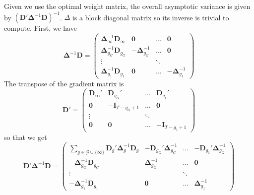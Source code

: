 \documentclass[12pt]{article}
\begin{document}
Given we use the optimal weight matrix, the overall asymptotic variance is given by $(\bm D' \bm \Delta^{-1} \bm D)^{-1}$. $\Delta$ is a block diagonal matrix so its inverse is trivial to compute. First, we have
\begin{equation*}
    \bm \Delta^{-1} \bm D = 
    \begin{pmatrix}
        \bm \Delta_{\infty}^{-1} \bm D_{\infty} & \bm 0 &  \hdots & \bm 0\\
        \bm \Delta_{g_G}^{-1} \bm D_{g_G} & -\bm \Delta_{g_G}^{-1} & \hdots & \bm 0\\
        \vdots & & \ddots &\\
        \bm \Delta_{g_1}^{-1} \bm D_{g_1} & \bm 0 & \hdots & - \bm \Delta_{g_1}^{-1}
    \end{pmatrix}
\end{equation*}
The transpose of the gradient matrix is
\begin{equation*}
    \bm D' =
    \begin{pmatrix}
        \bm D_{\infty}' & \bm D_{g_G}' & \hdots & \bm D_{g_1}'\\
        \bm 0 & -\bm I_{T-g_G + 1} & \hdots & \bm 0\\
        \vdots & & \ddots & \\
        \bm 0 & \bm 0 & \hdots & - \bm I_{T-g_1 + 1}
    \end{pmatrix}
\end{equation*}
so that we get
\begin{equation*}
    \bm D' \bm \Delta^{-1} \bm D = 
    \begin{pmatrix}
        \sum_{g \in \mathcal{G}\cup\{\infty\}} \bm D_g' \bm \Delta_g^{-1} \bm D_g & -\bm D_{g_G}' \bm \Delta_{g_G}^{-1} & \hdots & - \bm D_{g_1}' \bm \Delta_{g_G}^{-1}\\
        -\bm \Delta_{g_G}^{-1} \bm D_{g_G} & \bm \Delta_{g_G}^{-1} & \hdots & \bm 0\\
        \vdots & & \ddots &\\
        -\bm \Delta_{g_1}^{-1} \bm D_{g_1} & \bm 0 & \hdots & \bm \Delta_{g_1}^{-1}
    \end{pmatrix}
\end{equation*}
\end{document}
